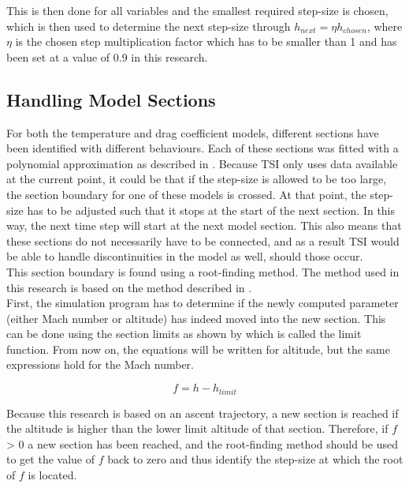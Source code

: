 \noindent
This is then done for all variables and the smallest required step-size is chosen, which is then used to determine the next step-size through $h_{next}=\eta h_{chosen}$, where $\eta$ is the chosen step multiplication factor which has to be smaller than 1 and has been set at a value of 0.9 in this research. 


\subsection{Handling Model Sections}
\label{subsec:handlingModelSections}
For both the temperature and drag coefficient models, different sections have been identified with different behaviours. Each of these sections was fitted with a polynomial approximation as described in . Because \ac{TSI} only uses data available at the current point, it could be that if the step-size is allowed to be too large, the section boundary for one of these models is crossed. At that point, the step-size has to be adjusted such that it stops at the start of the next section. In this way, the next time step will start at the next model section. This also means that these sections do not necessarily have to be connected, and as a result \ac{TSI} would be able to handle discontinuities in the model as well, should those occur. \\
This section boundary is found using a root-finding method. The method used in this research is based on the method described in \cite{bergsma2015application}. \\

\noindent
First, the simulation program has to determine if the newly computed parameter (either Mach number or altitude) has indeed moved into the new section. This can be done using the section limits as shown by  which is called the limit function. From now on, the equations will be written for altitude, but the same expressions hold for the Mach number.

\begin{equation} \label{eq:limitFunction}
f = h-h_{limit}
\end{equation}


\noindent
Because this research is based on an ascent trajectory, a new section is reached if the altitude is higher than the lower limit altitude of that section. Therefore, if $f$ > 0 a new section has been reached, and the root-finding method should be used to get the value of $f$ back to zero and thus identify the step-size at which the root of $f$ is located.\\

